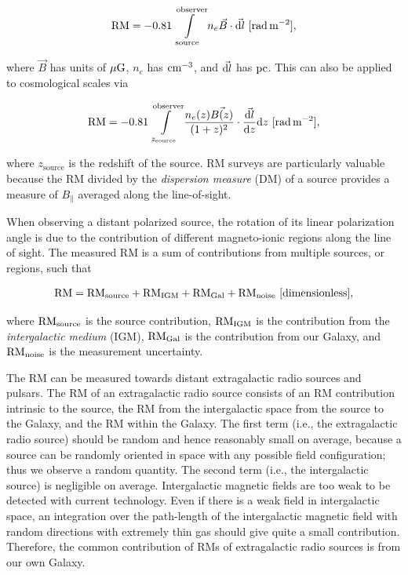\documentclass[a4paper,10pt]{article}
\begin{document}
\begin{align*}
	\mathrm{RM} = -0.81 \int\limits_\mathrm{source}^\mathrm{observer} n_e \vec{B}\cdot\vec{{\rm d}l} ~ [{\rm rad\,m^{-2}}],
\end{align*}

{\noindent}where $\vec{B}$ has units of $\mu{\rm G}$, $n_e$ has ${\rm cm^{-3}}$, and $\vec{{\rm d}l}$ has ${\rm pc}$. This can also be applied to cosmological scales via

\begin{align*}
	\mathrm{RM} = -0.81 \int\limits_{z_\mathrm{source}}^\mathrm{observer} \frac{n_e(z) \vec{B(z)}}{(1+z)^2} \cdot \frac{\vec{{\rm d}l}}{{\rm d}z} {\rm d}z ~ [{\rm rad\,m^{-2}}],
\end{align*}

{\noindent}where $z_\mathrm{source}$ is the redshift of the source. RM surveys are particularly valuable because the RM divided by the \textit{dispersion measure} (DM) of a source provides a measure of $B_\parallel$ averaged along the line-of-sight.

{\noindent}When observing a distant polarized source, the rotation of its linear polarization angle is due to the contribution of different magneto-ionic regions along the line of sight. The measured RM is a sum of contributions from multiple sources, or regions, such that

\begin{align*}
    {\rm RM} = {\rm RM}_{\rm source} + {\rm RM}_{\rm IGM} + {\rm RM}_{\rm Gal} + {\rm RM}_{\rm noise} ~ [{\rm dimensionless}],
\end{align*}

{\noindent}where ${\rm RM}_{\rm source}$ is the source contribution, ${\rm RM}_{\rm IGM}$ is the contribution from the \textit{intergalactic medium} (IGM), ${\rm RM}_{\rm Gal}$ is the contribution from our Galaxy, and ${\rm RM}_{\rm noise}$ is the measurement uncertainty.

{\noindent}The RM can be measured towards distant extragalactic radio sources and pulsars. The RM of an extragalactic radio source consists of an RM contribution intrinsic to the source, the RM from the intergalactic space from the source to the Galaxy, and the RM within the Galaxy. The first term (i.e., the extragalactic radio source) should be random and hence reasonably small on average, because a source can be randomly oriented in space with any possible field configuration; thus we observe a random quantity. The second term (i.e., the intergalactic source) is negligible on average. Intergalactic magnetic fields are too weak to be detected with current technology. Even if there is a weak field in intergalactic space, an integration over the path-length of the intergalactic magnetic field with random directions with extremely thin gas should give quite a small contribution. Therefore, the common contribution of RMs of extragalactic radio sources is from our own Galaxy. 
\end{document}
